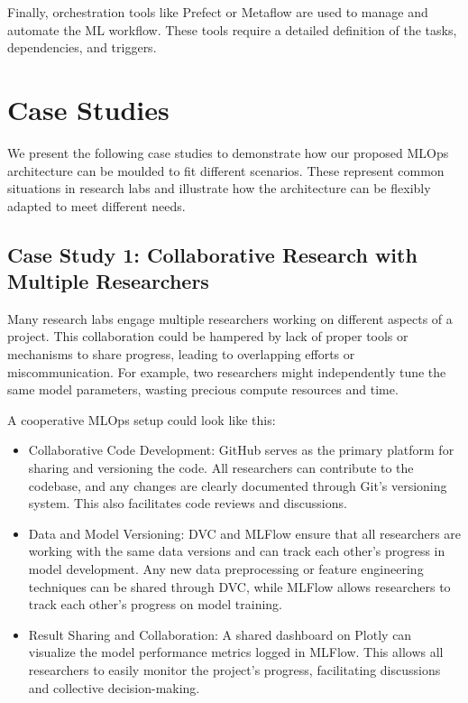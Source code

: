 Finally, orchestration tools like Prefect or Metaflow are used to manage and automate the ML workflow. These tools require a detailed definition of the tasks, dependencies, and triggers.

\section{Case Studies \label{case-studies}}
We present the following case studies to demonstrate how our proposed MLOps architecture can be moulded to fit different scenarios. These represent common situations in research labs and illustrate how the architecture can be flexibly adapted to meet different needs.

\subsection{Case Study 1: Collaborative Research with Multiple Researchers \label{case1}}
Many research labs engage multiple researchers working on different aspects of a project. This collaboration could be hampered by lack of proper tools or mechanisms to share progress, leading to overlapping efforts or miscommunication. For example, two researchers might independently tune the same model parameters, wasting precious compute resources and time.

A cooperative MLOps setup could look like this:
\begin{itemize}
    \item Collaborative Code Development: GitHub serves as the primary platform for sharing and versioning the code. All researchers can contribute to the codebase, and any changes are clearly documented through Git's versioning system. This also facilitates code reviews and discussions.
    \item Data and Model Versioning: DVC and MLFlow ensure that all researchers are working with the same data versions and can track each other's progress in model development. Any new data preprocessing or feature engineering techniques can be shared through DVC, while MLFlow allows researchers to track each other's progress on model training.
    \item Result Sharing and Collaboration: A shared dashboard on Plotly can visualize the model performance metrics logged in MLFlow. This allows all researchers to easily monitor the project's progress, facilitating discussions and collective decision-making.
\end{itemize}

